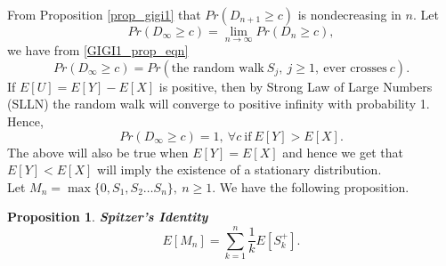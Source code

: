 \documentclass[a4paper,10pt]{article}
\theoremstyle{plain}
\newtheorem{prop}[thm]{Proposition}
\theoremstyle{definition}
\theoremstyle{remark}
\begin{document}
From Proposition \ref{prop_gigi1} that $Pr(D_{n+1} \geq c)$ is nondecreasing in $n$. Let
\begin{equation*}
Pr(D_{\infty} \geq c)=\lim_{n \rightarrow \infty}Pr(D_{n} \geq c),
\end{equation*}
we have from \ref{GIGI1_prop_eqn}
\begin{equation}
\label{random_walk_gigi1}
Pr(D_{\infty} \geq c) = Pr(\text{the random walk}~ S_j,~ j \geq 1,~\text{ever crosses}~ c).
\end{equation}
If $E[U]=E[Y]-E[X]$ is positive, then by Strong Law of Large Numbers (SLLN) the random walk will converge to positive infinity with probability 1. Hence,
\begin{equation*}
Pr(D_{\infty} \geq c) =1,~ \forall c ~\text{if}~ E[Y]>E[X].
\end{equation*}
The above will also be true when $E[Y]=E[X]$ and hence we get that $E[Y]< E[X]$ will imply the existence of a stationary distribution.\\
Let $M_n=\max\{0,S_1,S_2 \hdots S_n\},~ n \geq 1$. We have the following proposition.
\begin{prop}
\textbf{Spitzer's Identity}
\begin{equation*}
E[M_n]= \sum_{k=1}^{n} \frac{1}{k} E[S_k^+].
\end{equation*}
\end{prop}
\end{document}
